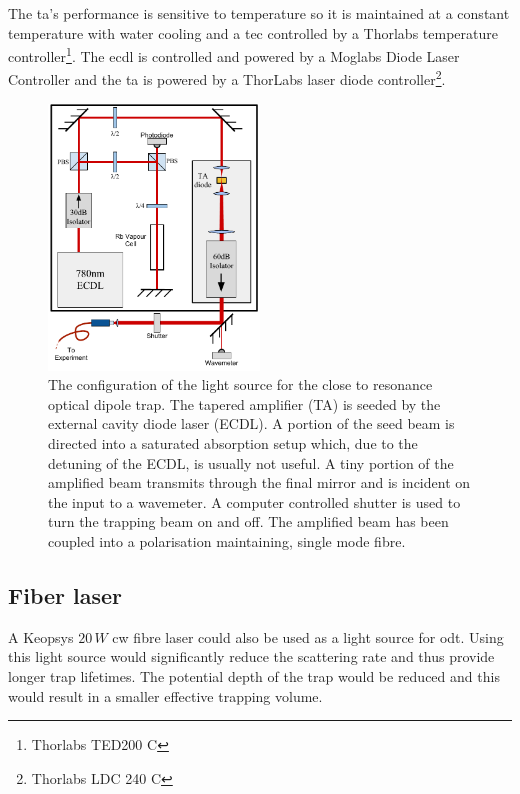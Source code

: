 The \gls{ta}'s performance is sensitive to temperature so it is maintained at a constant temperature with water cooling and a \gls{tec} controlled by a Thorlabs temperature controller\footnote{Thorlabs TED200 C}. The \gls{ecdl} is controlled and powered by a Moglabs Diode Laser Controller and the \gls{ta} is powered by a ThorLabs laser diode controller\footnote{Thorlabs LDC 240 C}.

\begin{figure}[h]
\centering
\includegraphics[width=0.5\textwidth]{figs/TAsetup.pdf}
\caption{The configuration of the light source for the close to resonance optical dipole trap. The tapered amplifier (TA) is seeded by the external cavity diode laser (ECDL). A portion of the seed beam is directed into a saturated absorption setup which, due to the detuning of the ECDL, is usually not useful. A tiny portion of the amplified beam transmits through the final mirror and is incident on the input to a wavemeter. A computer controlled shutter is used to turn the trapping beam on and off. The amplified beam has been coupled into a polarisation maintaining, single mode fibre.}
\end{figure}

\subsection{Fiber laser}

A Keopsys $20\,\unit{W}$ \gls{cw} fibre laser could also be used as a light source for \gls{odt}. Using this light source would significantly reduce the scattering rate and thus provide longer trap lifetimes. The potential depth of the trap would be reduced and this would result in a smaller effective trapping volume.

